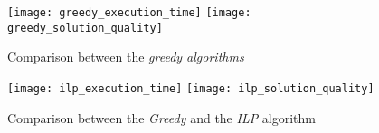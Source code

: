 \documentclass[12pt, a4paper]{article}
\begin{document}
\begin{enumerate}[label=(\alph*)]
    \begin{figure}[H]
      \texttt{[image: greedy\_execution\_time]}
      \texttt{[image: greedy\_solution\_quality]}
      \caption{Comparison between the \textit{greedy algorithms}}
      \label{fig:greedy}
    \end{figure}

    \begin{figure}[H]
      \texttt{[image: ilp\_execution\_time]}
      \texttt{[image: ilp\_solution\_quality]}
      \caption{Comparison between the \textit{Greedy} and the \textit{ILP} algorithm}
      \label{fig:ilp}
    \end{figure}

\end{enumerate}
\end{document}
